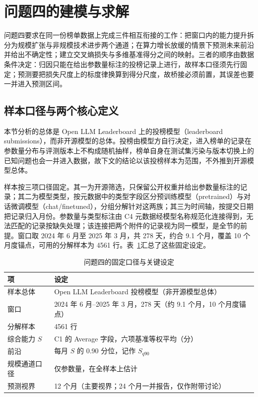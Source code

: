 \section{问题四的建模与求解}
\label{sec:problem4}

问题四要求在同一份榜单数据上完成三件相互衔接的工作：把窗口内的能力提升拆分为规模扩张与非规模技术进步两个通道；在算力增长放缓的情景下预测未来前沿并给出不确定性；建立交叉熵损失与多维基准得分之间的映射。三者的顺序由数据条件决定：归因只能在给出参数量标注的投榜记录上进行，故样本口径须先行固定；预测要把损失尺度上的标度律换算到得分尺度，故桥接必须前置，其误差也要一并进入预测区间。

\subsection{样本口径与两个核心定义}
\label{subsec:q4-scope}

本节分析的总体是 Open LLM Leaderboard 上的投榜模型（leaderboard submissions），而非开源模型的总体\citep{beeching2023leaderboard}。投榜由模型方自行决定，进入榜单的记录在参数量分布与评测版本上不构成随机抽样，榜单自身在测试集污染与版本切换上的已知问题也会一并进入数据\citep{fourrier2024leaderboard}，故下文的结论以该投榜样本为范围，不外推到开源模型总体。

样本按三项口径固定。其一为开源筛选，只保留公开权重并给出参数量标注的记录；其二为模型类型，按元数据中的类型字段区分预训练模型（pretrained）与对话微调模型（chat/finetuned），分组分解针对这两族；其三为时间轴，按提交日期把记录归入月份。参数量与类型标注由 C4 元数据经模型名称规范化连接得到，无法匹配的记录按缺失处理；该连接把两个附件的记录视为同一模型，是全节的前提。窗口取 2024 年 6 月至 2025 年 3 月，共 278 天，约合 9.1 个月，覆盖 10 个月度锚点，可用的分解样本为 4561 行。表~\ref{tab:q4-scope}汇总了这些固定设定。

\begin{table}[H]
  \centering
  \caption{问题四的固定口径与关键设定}
  \label{tab:q4-scope}
  \begin{tabular}{@{}ll@{}}
    \toprule
    项 & 设定 \\
    \midrule
    样本总体 & Open LLM Leaderboard 投榜模型（非开源模型总体） \\
    窗口 & 2024 年 6 月--2025 年 3 月，278 天（约 9.1 个月，10 个月度锚点） \\
    分解样本 & 4561 行 \\
    综合能力 $S$ & C1 的 Average 字段，六项基准等权平均（分） \\
    前沿 & 每月 $S$ 的 0.90 分位，记作 $S_{q90}$ \\
    规模通道口径 & 仅参数量，在全样本上估计 \\
    预测视界 & 12 个月（主要视界；24 个月一并报告，仅作附带讨论） \\
    \bottomrule
  \end{tabular}
\end{table}

